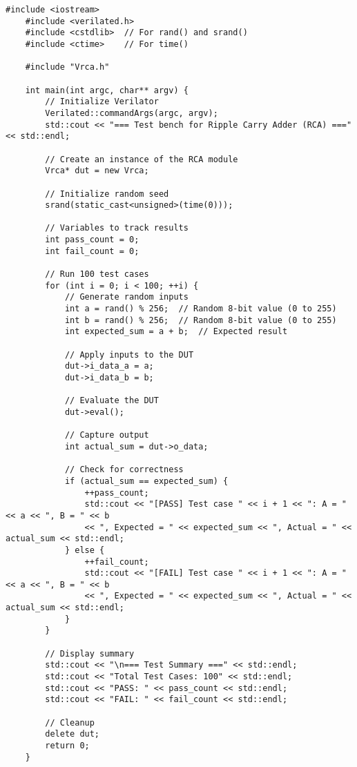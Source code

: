 \begin{lstlisting}[style = C, caption={Test case cho Bộ cộng}]
	#include <iostream>
	#include <verilated.h>
	#include <cstdlib>  // For rand() and srand()
	#include <ctime>    // For time()
	
	#include "Vrca.h"
	
	int main(int argc, char** argv) {
		// Initialize Verilator
		Verilated::commandArgs(argc, argv);
		std::cout << "=== Test bench for Ripple Carry Adder (RCA) ===" << std::endl;
		
		// Create an instance of the RCA module
		Vrca* dut = new Vrca;
		
		// Initialize random seed
		srand(static_cast<unsigned>(time(0)));
		
		// Variables to track results
		int pass_count = 0;
		int fail_count = 0;
		
		// Run 100 test cases
		for (int i = 0; i < 100; ++i) {
			// Generate random inputs
			int a = rand() % 256;  // Random 8-bit value (0 to 255)
			int b = rand() % 256;  // Random 8-bit value (0 to 255)
			int expected_sum = a + b;  // Expected result
			
			// Apply inputs to the DUT
			dut->i_data_a = a;
			dut->i_data_b = b;
			
			// Evaluate the DUT
			dut->eval();
			
			// Capture output
			int actual_sum = dut->o_data;
			
			// Check for correctness
			if (actual_sum == expected_sum) {
				++pass_count;
				std::cout << "[PASS] Test case " << i + 1 << ": A = " << a << ", B = " << b
				<< ", Expected = " << expected_sum << ", Actual = " << actual_sum << std::endl;
			} else {
				++fail_count;
				std::cout << "[FAIL] Test case " << i + 1 << ": A = " << a << ", B = " << b
				<< ", Expected = " << expected_sum << ", Actual = " << actual_sum << std::endl;
			}
		}
		
		// Display summary
		std::cout << "\n=== Test Summary ===" << std::endl;
		std::cout << "Total Test Cases: 100" << std::endl;
		std::cout << "PASS: " << pass_count << std::endl;
		std::cout << "FAIL: " << fail_count << std::endl;
		
		// Cleanup
		delete dut;
		return 0;
	}
\end{lstlisting}